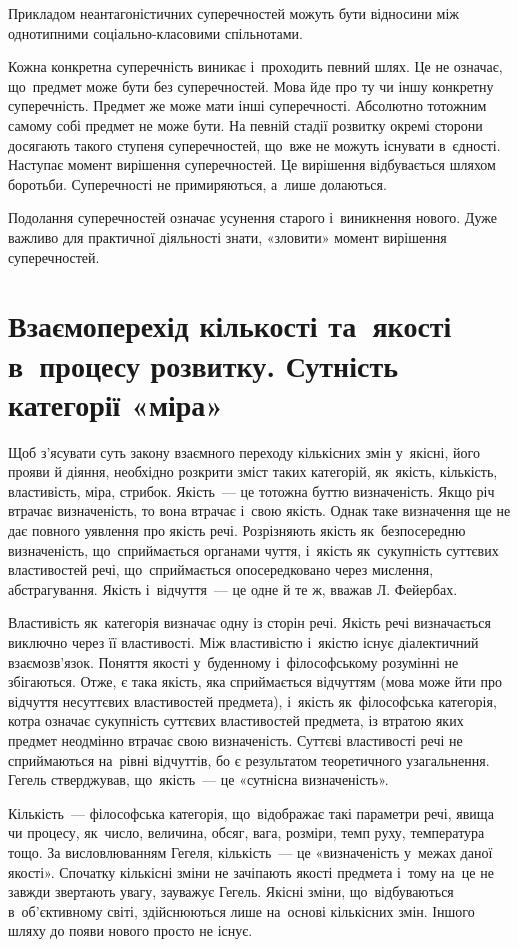 \documentclass[a5paper,oneside,DIV=12,12pt,headings=small]{scrartcl}
\begin{document}
		Прикладом неантагоністичних суперечностей можуть бути відносини між однотипними соціально-класовими спільнотами.
		
		Кожна конкретна суперечність виникає і~проходить певний шлях. Це не означає, що~предмет може бути без суперечностей. Мова йде про ту чи іншу конкретну суперечність. Предмет же може мати інші суперечності. Абсолютно тотожним самому собі предмет не може бути. На певній стадії розвитку окремі сторони досягають такого ступеня суперечностей, що~вже не можуть існувати в~єдності. Наступає момент вирішення суперечностей. Це вирішення відбувається шляхом боротьби. Суперечності не примиряються, а~лише долаються.
		
		Подолання суперечностей означає усунення старого і~виникнення нового. Дуже важливо для практичної діяльності знати, «зловити» момент вирішення суперечностей.
		
	\section{Взаємоперехід кількості та~якості в~процесу розвитку. Сутність категорії «міра»}
		Щоб з'ясувати суть закону взаємного переходу кількісних змін у~якісні, його прояви й діяння, необхідно розкрити зміст таких категорій, як~якість, кількість, властивість, міра, стрибок. Якість~— це тотожна буттю визначеність. Якщо річ втрачає визначеність, то вона втрачає і~свою якість. Однак таке визначення ще не дає повного уявлення про якість речі. Розрізняють якість як~безпосередню визначеність, що~сприймається органами чуття, і~якість як~сукупність суттєвих властивостей речі, що~сприймається опосередковано через мислення, абстрагування. Якість і~відчуття~— це одне й те ж, вважав Л. Фейербах.

		Властивість як~категорія визначає одну із сторін речі. Якість речі визначається виключно через її властивості. Між властивістю і~якістю існує діалектичний взаємозв'язок. Поняття якості у~буденному і~філософському розумінні не збігаються. Отже, є така якість, яка сприймається відчуттям (мова може йти про відчуття несуттєвих властивостей предмета), і~якість як~філософська категорія, котра означає сукупність суттєвих властивостей предмета, із втратою яких предмет неодмінно втрачає свою визначеність. Суттєві властивості речі не сприймаються на~рівні відчуттів, бо є результатом теоретичного узагальнення. Гегель стверджував, що~якість~— це «сутнісна визначеність».
		
		Кількість~— філософська категорія, що~відображає такі параметри речі, явища чи процесу, як~число, величина, обсяг, вага, розміри, темп руху, температура тощо. За висловлюванням Гегеля, кількість~— це «визначеність у~межах даної якості». Спочатку кількісні зміни не зачіпають якості предмета і~тому на~це не завжди звертають увагу, зауважує Гегель. Якісні зміни, що~відбуваються в~об'єктивному світі, здійснюються лише на~основі кількісних змін. Іншого шляху до появи нового просто не існує.
		
\end{document}
